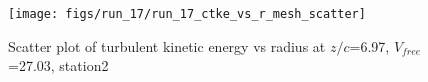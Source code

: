 \begin{figure}[H]
\centering
\texttt{[image: figs/run\_17/run\_17\_ctke\_vs\_r\_mesh\_scatter]}
\caption{Scatter plot of turbulent kinetic energy vs radius at $z/c$=6.97, $V_{free}$=27.03, station2}
\label{fig:run_17_ctke_vs_r_mesh_scatter}
\end{figure}


